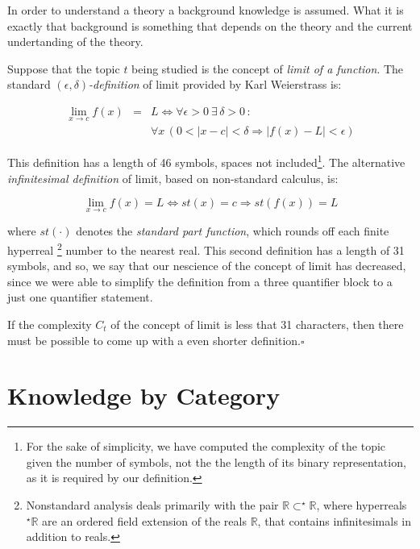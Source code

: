In order to understand a theory a background knowledge is assumed. What it is exactly that background is something that depends on the theory and the current undertanding of the theory.

\begin{example}
Suppose that the topic $t$ being studied is the concept of \emph{limit of a function}. The standard \emph{$\left(\epsilon,\delta\right)$-definition} of limit provided by Karl Weierstrass is:

\begin{eqnarray*}
\lim_{x\rightarrow c}f(x) & = & L\Leftrightarrow\forall\epsilon>0\:\exists\,\delta>0\,:\,\\
 &  & \forall x\,\left(0<\left|x-c\right|<\delta\Rightarrow\left|f(x)-L\right|<\epsilon\right)
\end{eqnarray*}


This definition has a length of 46 symbols, spaces not included\footnote{
For the sake of simplicity, we have computed the complexity of the
topic given the number of symbols, not the the length of its binary
representation, as it is required by our definition.}. The alternative \emph{infinitesimal definition} of limit, based
on non-standard calculus, is:

\[
\lim_{x\rightarrow c}f(x)=L\Leftrightarrow st(x)=c\Rightarrow st(f(x))=L
\]

where $st(\cdot)$ denotes the \emph{standard part function}, which \textquotedbl{}rounds off\textquotedbl{} each finite hyperreal%
\footnote{Nonstandard analysis deals primarily with the pair $\mathbb{R\subset^{\star}\mathbb{R}}$,
where hyperreals $^{\star}\mathbb{R}$ are an ordered field extension
of the reals $\mathbb{R}$, that contains infinitesimals in addition
to reals.%
} number to the nearest real. This second definition has a length of 31 symbols, and so, we say that our nescience of the concept of limit has decreased, since we were able to simplify the definition from a three quantifier block to a just one quantifier statement.

If the complexity $C_{t}$ of the concept of limit is less that 31 characters, then there must be possible to come up with a even shorter definition.\hfill{}$\square$
\end{example}

%
%
\section{Knowledge by Category}

